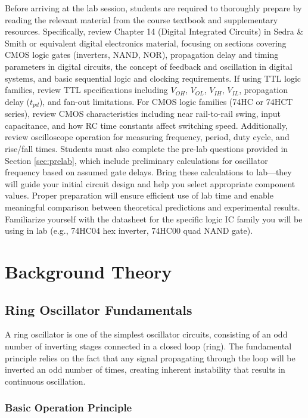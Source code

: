 \documentclass[10pt]{article}
\begin{document}
Before arriving at the lab session, students are required to thoroughly prepare by reading the relevant material from the course textbook and supplementary resources.  Specifically, review Chapter 14 (Digital Integrated Circuits) in Sedra \& Smith or equivalent digital electronics material, focusing on sections covering CMOS logic gates (inverters, NAND, NOR), propagation delay and timing parameters in digital circuits, the concept of feedback and oscillation in digital systems, and basic sequential logic and clocking requirements. If using TTL logic families, review TTL specifications including $V_{OH}$, $V_{OL}$, $V_{IH}$, $V_{IL}$, propagation delay ($t_{pd}$), and fan-out limitations. For CMOS logic families (74HC or 74HCT series), review CMOS characteristics including near rail-to-rail swing, input capacitance, and how RC time constants affect switching speed. Additionally, review oscilloscope operation for measuring frequency, period, duty cycle, and rise/fall times. Students must also complete the pre-lab questions provided in Section \ref{sec:prelab}, which include preliminary calculations for oscillator frequency based on assumed gate delays.  Bring these calculations to lab—they will guide your initial circuit design and help you select appropriate component values.  Proper preparation will ensure efficient use of lab time and enable meaningful comparison between theoretical predictions and experimental results.  Familiarize yourself with the datasheet for the specific logic IC family you will be using in lab (e.g., 74HC04 hex inverter, 74HC00 quad NAND gate).

\section{Background Theory}

\subsection{Ring Oscillator Fundamentals}

A ring oscillator is one of the simplest oscillator circuits, consisting of an odd number of inverting stages connected in a closed loop (ring). The fundamental principle relies on the fact that any signal propagating through the loop will be inverted an odd number of times, creating inherent instability that results in continuous oscillation. 

\subsubsection{Basic Operation Principle}
\end{document}
